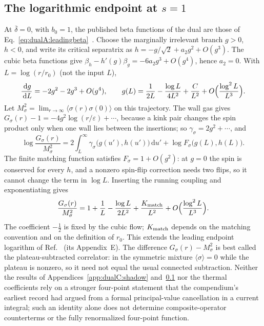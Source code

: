 \documentclass[11pt,a4paper]{article}
\numberwithin{equation}{section}
\newcommand{\dd}{\,\mathrm d}
\newcommand{\db}{\bar\delta}
\begin{document}
\subsection{The logarithmic endpoint at \texorpdfstring{$s=1$}{s=1}}\label{app:dualC:logs}
At $\db=0$, with $b_0=1$, the published beta functions of the dual are those of
Eq.~\eqref{eq:dualA:leadingbeta}~\cite{Benedetti:2025nzp}.
Choose the marginally irrelevant branch $g>0$, $h<0$, and write its critical separatrix as
$h=-g/\sqrt2+a_2g^2+O(g^3)$. The cubic beta functions give $\beta_h-h'(g)\beta_g=-6a_2g^3+O(g^4)$, hence $a_2=0$.
With $L=\log(r/r_0)$ (not the input $L$),
\begin{equation}
 \frac{\dd g}{\dd L}=-2g^2-2g^3+O(g^4),\qquad
 g(L)=\frac1{2L}-\frac{\log L}{4L^2}+\frac{C}{L^2}+O\Bigl(\frac{\log^2L}{L^3}\Bigr).
\end{equation}
Let $M_\sigma^2=\lim_{r\to\infty}\langle\sigma(r)\sigma(0)\rangle$ on this trajectory. The wall gas gives
$G_\sigma(r)-1=-4g^2\log(r/\varepsilon)+\cdots$, because a kink pair changes the spin product only when one wall lies
between the insertions; so $\gamma_\sigma=2g^2+\cdots$, and
\begin{equation}
 \log\frac{G_\sigma(r)}{M_\sigma^2}=2\int_L^\infty\gamma_\sigma\bigl(g(u'),h(u')\bigr)\dd u'+\log F_\sigma\bigl(g(L),h(L)\bigr).
\end{equation}
The finite matching function satisfies $F_\sigma=1+O(g^2)$: at $g=0$ the spin is conserved for every $h$, and a nonzero
spin-flip correction needs two flips, so it cannot change the term in $\log L$. Inserting the running coupling and
exponentiating gives
\begin{equation}
 \frac{G_\sigma(r)}{M_\sigma^2}=1+\frac1L-\frac{\log L}{2L^2}+\frac{K_{\rm match}}{L^2}+O\Bigl(\frac{\log^2L}{L^3}\Bigr).
\end{equation}
The coefficient $-\frac12$ is fixed by the cubic flow; $K_{\rm match}$ depends on the matching convention and on the
definition of $r_0$. This extends the leading endpoint logarithm of Ref.~\cite{Benedetti:2025nzp} (its Appendix~E).
The difference $G_\sigma(r)-M_\sigma^2$ is best called the plateau-subtracted correlator: in the symmetric mixture
$\langle\sigma\rangle=0$ while the plateau is nonzero, so it need not equal the usual connected subtraction. Neither
the results of Appendices~\ref{app:dualC:shadow} and~\ref{app:dualC:logs} nor the thermal coefficients rely on a
stronger four-point statement that the compendium's earliest record had argued from a formal
principal-value cancellation in a current integral; such an identity alone does not determine composite-operator
counterterms or the fully renormalized four-point function.
\end{document}
